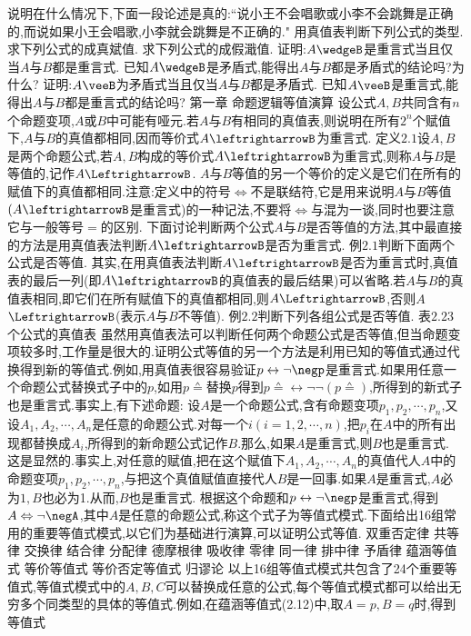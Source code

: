 {说明在什么情况下,下面一段论述是真的:“说小王不会唱歌或小李不会跳舞是正确的,而说如果小王会唱歌,小李就会跳舞是不正确的."
用真值表判断下列公式的类型.
求下列公式的成真斌值.
求下列公式的成假濈值.
证明:$A\wedgeB$是重言式当且仅当$A$与$B$都是重言式.
已知$A\wedgeB$是矛盾式,能得出$A$与$B$都是矛盾式的结论吗?为什么?
证明:$A\veeB$为矛盾式当且仅当$A$与$B$都是矛盾式.
已知$A\veeB$是重言式,能得出$A$与$B$都是重言式的结论吗?
{第一章}
{命题逻辑等值演算}
设公式$A,B$共同含有$n$个命题变项,$A$或$B$中可能有哑元.若$A$与$B$有相同的真值表,则说明在所有$2^{n}$个赋值下,$A$与$B$的真值都相同,因而等价式$A\leftrightarrowB$为重言式.
定义$2.1$设$A,B$是两个命题公式,若$A,B$构成的等价式$A\leftrightarrowB$为重言式,则称$A$与$B$是等值的,记作$A\LeftrightarrowB$.
$A$与$B$等值的另一个等价的定义是它们在所有的赋值下的真值都相同.注意:定义中的符号$\Leftrightarrow$不是联结符,它是用来说明$A$与$B$等值$(A\leftrightarrowB$是重言式)的一种记法,不要将$\Leftrightarrow$与混为一谈,同时也要注意它与一般等号$=$的区别.
下面讨论判断两个公式$A$与$B$是否等值的方法,其中最直接的方法是用真值表法判断$A\leftrightarrowB$是否为重言式.
例$2.1$判断下面两个公式是否等值.
其实,在用真值表法判断$A\leftrightarrowB$是否为重言式时,真值表的最后一列(即$A\leftrightarrowB$的真值表的最后结果)可以省略.若$A$与$B$的真值表相同,即它们在所有赋值下的真值都相同,则$A\LeftrightarrowB$,否则$A$$\LeftrightarrowB$(表示$A$与$B$不等值).
例$2.2$判断下列各组公式是否等值.
表$2.23$个公式的真值表
虽然用真值表法可以判断任何两个命题公式是否等值,但当命题变项较多时,工作量是很大的.证明公式等值的另一个方法是利用已知的等值式通过代换得到新的等值式.例如,用真值表很容易验证$p\leftrightarrow\neg\negp$是重言式.如果用任意一个命题公式替换式子中的$p$,如用$p\wedgeq$替换$p$得到$p\wedgeq\leftrightarrow\neg\neg(p\wedgeq)$,所得到的新式子也是重言式.事实上,有下述命题:
设$A$是一个命题公式,含有命题变项$p_{1},p_{2},\cdots,p_{n}$,又设$A_{1},A_{2},\cdots,A_{n}$是任意的命题公式.对每一个$i(i=1,2,\cdots,n)$,把$p_{i}$在$A$中的所有出现都替换成$A_{i}$,所得到的新命题公式记作$B$.那么,如果$A$是重言式,则$B$也是重言式.
这是显然的.事实上,对任意的赋值,把在这个赋值下$A_{1},A_{2},\cdots,A_{n}$的真值代人$A$中的命题变项$p_{1},p_{2},\cdots,p_{n}$,与把这个真值赋值直接代人$B$是一回事.如果$A$是重言式,$A$必为$1,B$也必为1.从而,$B$也是重言式.
根据这个命题和$p\leftrightarrow\neg\negp$是重言式,得到$A\Leftrightarrow\neg\negA$,其中$A$是任意的命题公式,称这个式子为等值式模式.下面给出16组常用的重要等值式模式,以它们为基础进行演算,可以证明公式等值.
双重否定律
共等律
交换律
结合律
分配律
德摩根律
吸收律
零律
同一律
排中律
予盾律
蕴涵等值式
等价等值式
等价否定等值式
归谬论
以上16组等值式模式共包含了24个重要等值式,等值式模式中的$A,B,C$可以替换成任意的公式,每个等值式模式都可以给出无穷多个同类型的具体的等值式.例如,在蕴涵等值式(2.12)中,取$A=p,B=q$时,得到等值式
$$}
